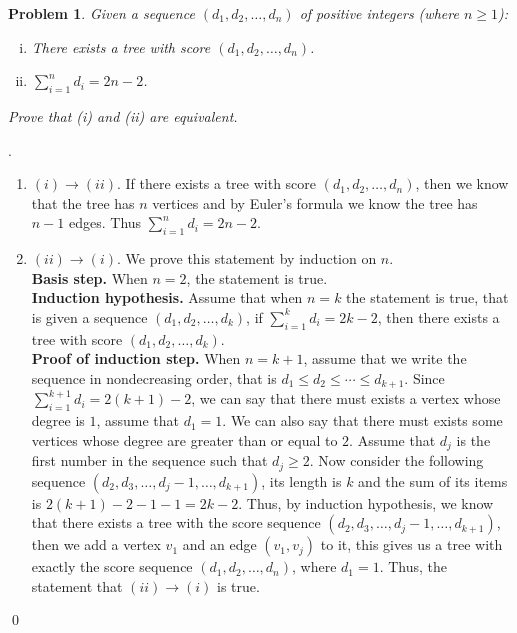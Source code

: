 \documentclass[12pt]{article}
\newtheorem{hw}{Problem}
\newenvironment{sol}
  {\par\vspace{3mm}\noindent{\it Solution}.}
  {\qed}
\begin{document}
\begin{hw}
Given a sequence $(d_1, d_2, \ldots, d_n)$ of  positive integers (where $n\geq 1$):
\begin{enumerate}[(i)]
  \item There exists a tree with score $(d_1, d_2, \ldots, d_n)$.
  \item $\sum_{i=1}^{n}d_i=2n-2$.
\end{enumerate}
Prove that (i) and (ii) are equivalent.
\end{hw}
\begin{sol}
	\begin{enumerate}
		\item $(i) \rightarrow (ii)$. If there exists a tree with score $(d_1, d_2, \ldots, d_n)$, then we know that the tree has $n$ vertices and by Euler's formula we know the tree has $n-1$ edges. Thus $\sum_{i=1}^{n}d_i=2n-2$.
		\item $(ii) \rightarrow (i)$. We prove this statement by induction on $n$.\\
		\textbf{Basis step.} When $n = 2$, the statement is true.\\
		\textbf{Induction hypothesis.} Assume that when $n = k$ the statement is true, that is given a sequence $(d_1,d_2,\ldots,d_k)$, if $\sum_{i=1}^{k}d_i=2k-2$, then there exists a tree with score $(d_1, d_2, \ldots, d_k)$.\\
		\textbf{Proof of induction step.} When $n = k+1$, assume that we write the sequence in nondecreasing order, that is $d_1 \leq d_2 \leq \cdots \leq d_{k+1}$. Since $\sum_{i=1}^{k+1}d_i=2(k+1)-2$, we can say that there must exists a vertex whose degree is $1$, assume that $d_1 = 1$. We can also say that there must exists some vertices whose degree are greater than or equal to $2$. Assume that $d_j$ is the first number in the sequence such that $d_j \geq 2$. Now consider the following sequence $(d_2,d_3,\ldots,d_j-1,\ldots,d_{k+1})$, its length is $k$ and the sum of its items is $2(k+1) - 2 -1 - 1 = 2k-2$. Thus, by induction hypothesis, we know that there exists a tree with the score sequence $(d_2,d_3,\ldots,d_j-1,\ldots,d_{k+1})$, then we add a vertex $v_1$ and an edge $(v_1,v_j)$ to it, this gives us a tree with exactly the score sequence $(d_1, d_2, \ldots, d_n)$, where $d_1 = 1$. Thus, the statement that $(ii) \rightarrow (i)$ is true.
	\end{enumerate}
\end{sol}
\end{document}
